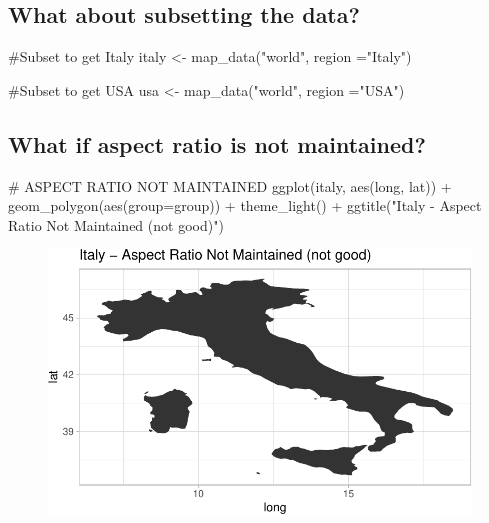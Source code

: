 \documentclass[
  letterpaper,
  DIV=11,
  numbers=noendperiod]{scrartcl}
\newenvironment{Shaded}{\begin{snugshade}}{\end{snugshade}}
\newcommand{\AttributeTok}[1]{\textcolor[rgb]{0.40,0.45,0.13}{#1}}
\newcommand{\CommentTok}[1]{\textcolor[rgb]{0.37,0.37,0.37}{#1}}
\newcommand{\FunctionTok}[1]{\textcolor[rgb]{0.28,0.35,0.67}{#1}}
\newcommand{\NormalTok}[1]{\textcolor[rgb]{0.00,0.23,0.31}{#1}}
\newcommand{\OtherTok}[1]{\textcolor[rgb]{0.00,0.23,0.31}{#1}}
\newcommand{\SpecialCharTok}[1]{\textcolor[rgb]{0.37,0.37,0.37}{#1}}
\newcommand{\StringTok}[1]{\textcolor[rgb]{0.13,0.47,0.30}{#1}}
\begin{document}
\hypertarget{what-about-subsetting-the-data}{%
\subsection{What about subsetting the
data?}\label{what-about-subsetting-the-data}}

\begin{Shaded}
\begin{Highlighting}[]
\CommentTok{\#Subset to get Italy}
\NormalTok{italy }\OtherTok{\textless{}{-}} \FunctionTok{map\_data}\NormalTok{(}\StringTok{"world"}\NormalTok{, }\AttributeTok{region =}\StringTok{"Italy"}\NormalTok{)}

\CommentTok{\#Subset to get USA}
\NormalTok{usa }\OtherTok{\textless{}{-}} \FunctionTok{map\_data}\NormalTok{(}\StringTok{"world"}\NormalTok{, }\AttributeTok{region =}\StringTok{"USA"}\NormalTok{)}
\end{Highlighting}
\end{Shaded}

\hypertarget{what-if-aspect-ratio-is-not-maintained}{%
\subsection{What if aspect ratio is not
maintained?}\label{what-if-aspect-ratio-is-not-maintained}}

\begin{Shaded}
\begin{Highlighting}[]
\CommentTok{\# ASPECT RATIO NOT MAINTAINED}
\FunctionTok{ggplot}\NormalTok{(italy, }\FunctionTok{aes}\NormalTok{(long, lat)) }\SpecialCharTok{+} 
  \FunctionTok{geom\_polygon}\NormalTok{(}\FunctionTok{aes}\NormalTok{(}\AttributeTok{group=}\NormalTok{group)) }\SpecialCharTok{+} 
  \FunctionTok{theme\_light}\NormalTok{() }\SpecialCharTok{+}
  \FunctionTok{ggtitle}\NormalTok{(}\StringTok{"Italy {-} Aspect Ratio Not Maintained (not good)"}\NormalTok{)}
\end{Highlighting}
\end{Shaded}

\begin{figure}[H]

{\centering \includegraphics{118_K_maps1_files/figure-pdf/unnamed-chunk-4-1.pdf}

}

\end{figure}
\end{document}
